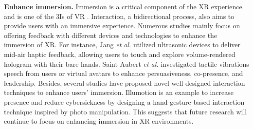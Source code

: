 \documentclass[review]{fcs}
\newcommand{\revise}[2]{\textcolor[rgb]{0,0,0}{#2}}
\begin{document}
\textbf{Enhance immersion.}
\revise{Immersion is a critical component of the XR experience and constitutes one of the 3I of VR \cite{DBLP:books/daglib/0011673}}{Immersion is a critical component of the XR experience and is one of the 3Is of VR \cite{DBLP:books/daglib/0011673}}. Interaction, a bidirectional process, also aims to provide users with an immersive experience. Numerous studies mainly focus on offering feedback with different devices and technologies to enhance the immersion of XR. 
\revise{For instance, Jang \textit{et al.} utilized ultrasonic devices to deliver mid-air haptic feedback, allowing users to touch and explore volume-rendered hologram with their bare hands \cite{DBLP:conf/ismar/JangFP22}. Saint-Aubert \textit{et al.} investigated tactile vibrations speech from users or virtual avatars to enhance persuasiveness, co-presence, and leadership \cite{DBLP:conf/vr/SaintAubertAMPAL23}.}{For instance, Jang \textit{et al.} \cite{DBLP:conf/ismar/JangFP22} utilized ultrasonic devices to deliver mid-air haptic feedback, allowing users to touch and explore volume-rendered hologram with their bare hands. Saint-Aubert \textit{et al.} \cite{DBLP:conf/vr/SaintAubertAMPAL23} investigated tactile vibrations speech from users or virtual avatars to enhance persuasiveness, co-presence, and leadership.} Besides, several studies have proposed novel well-designed interaction techniques to enhance users' immersion. 
\revise{Illumotion is an example to increase presence and reduce cybersickness by designing a hand-gesture-based interaction technique inspired by photo manipulation \cite{DBLP:conf/vr/SinJLLLN24}.}{Illumotion \cite{DBLP:conf/vr/SinJLLLN24} is an example to increase presence and reduce cybersickness by designing a hand-gesture-based interaction technique inspired by photo manipulation.} This suggests that future research will continue to focus on enhancing immersion in XR environments.
\end{document}
